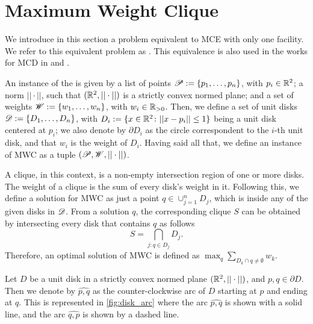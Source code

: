 \section{Maximum Weight Clique}

We introduce in this section a problem equivalent to MCE with only one facility. We refer to this equivalent problem as . This equivalence is also used in the works for MCD in  and .

An instance of the  is given by a list of points \mbox{$\mathscr{P}:=\{p_1,\dots,p_n\}$}, with $p_i \in \mathbb{R}^2$; 
a norm $||\cdot||$, such that $(\mathbb{R}^2, ||\cdot||)$ is a strictly convex normed plane; and a set of weights \mbox{$\mathscr{W}:=\{w_1, \dots, w_n\}$}, with $w_i\in \mathbb{R}_{>0}$. 
Then, we define a set of unit disks $\mathscr{D}:=\{D_1, \dots, D_n\}$, with $D_i:=\{x \in \mathbb{R}^2 \colon ||x-p_i|| \le 1\}$ being a unit disk centered at $p_i$; we also denote by $\partial D_i$ as the circle correspondent to the $i$-th unit disk, and that $w_i$ is the weight of $D_i$.
Having said all that, we define an instance of MWC as a tuple $(\mathscr{P}, \mathscr{W}, ||\cdot||)$.

A clique, in this context, is a non-empty intersection region of one or more disks. The weight of a clique is the sum of every disk's weight in it.
Following this, we define a solution for MWC as just a point $q\in\cup_{j=1}^n D_j$, which is inside any of the given disks in $\mathscr{D}$.
From a solution $q$, the corresponding clique $S$ can be obtained by intersecting every disk that contains $q$ as follows
\begin{equation*}
	S = \bigcap_{j : q \in D_j} D_j.
\end{equation*}
Therefore, an optimal solution of MWC is defined as	$\max_{q} \sum_{D_k \cap q \neq \emptyset} w_k$.


Let $D$ be a unit disk in a strictly convex normed plane $(\mathbb{R}^2, ||\cdot||)$, and $p, q \in \partial D$. Then we denote by $\widehat{p, q}$ as the counter-clockwise arc of $D$ starting at $p$ and ending at $q$. This is represented in \autoref{fig:disk_arc} where the arc $\widehat{p,q}$ is shown with a solid line, and the arc $\widehat{q, p}$ is shown by a dashed line.

